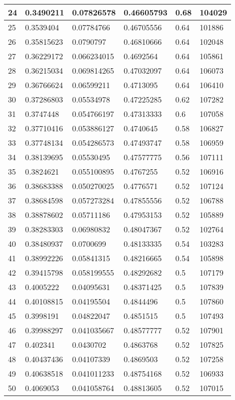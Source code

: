 \begin{longtable}{|l|l|l|l|l|l|}
24 & 0.3490211 & 0.07826578 & 0.46605793 & 0.68 & 104029 \\ \hline 
25 & 0.3539404 & 0.07784766 & 0.46705556 & 0.64 & 101886 \\ \hline 
26 & 0.35815623 & 0.0790797 & 0.46810666 & 0.64 & 102048 \\ \hline 
27 & 0.36229172 & 0.066234015 & 0.4692564 & 0.64 & 105861 \\ \hline 
28 & 0.36215034 & 0.069814265 & 0.47032097 & 0.64 & 106073 \\ \hline 
29 & 0.36766624 & 0.06599211 & 0.4713095 & 0.64 & 106410 \\ \hline 
30 & 0.37286803 & 0.05534978 & 0.47225285 & 0.62 & 107282 \\ \hline 
31 & 0.3747448 & 0.054766197 & 0.47313333 & 0.6 & 107058 \\ \hline 
32 & 0.37710416 & 0.053886127 & 0.4740645 & 0.58 & 106827 \\ \hline 
33 & 0.37748134 & 0.054286573 & 0.47493747 & 0.58 & 106959 \\ \hline 
34 & 0.38139695 & 0.05530495 & 0.47577775 & 0.56 & 107111 \\ \hline 
35 & 0.3824621 & 0.055100895 & 0.4767255 & 0.52 & 106916 \\ \hline 
36 & 0.38683388 & 0.050270025 & 0.4776571 & 0.52 & 107124 \\ \hline 
37 & 0.38684598 & 0.057273284 & 0.47855556 & 0.52 & 106788 \\ \hline 
38 & 0.38878602 & 0.05711186 & 0.47953153 & 0.52 & 105889 \\ \hline 
39 & 0.38283303 & 0.06980832 & 0.48047367 & 0.52 & 102764 \\ \hline 
40 & 0.38480937 & 0.0700699 & 0.48133335 & 0.54 & 103283 \\ \hline 
41 & 0.38992226 & 0.05841315 & 0.48216665 & 0.54 & 105898 \\ \hline 
42 & 0.39415798 & 0.058199555 & 0.48292682 & 0.5 & 107179 \\ \hline 
43 & 0.4005222 & 0.04095631 & 0.48371425 & 0.5 & 107839 \\ \hline 
44 & 0.40108815 & 0.04195504 & 0.4844496 & 0.5 & 107860 \\ \hline 
45 & 0.3998191 & 0.04822047 & 0.4851515 & 0.5 & 107493 \\ \hline 
46 & 0.39988297 & 0.041035667 & 0.48577777 & 0.52 & 107901 \\ \hline 
47 & 0.402341 & 0.0430702 & 0.4863768 & 0.52 & 107825 \\ \hline 
48 & 0.40437436 & 0.04107339 & 0.4869503 & 0.52 & 107258 \\ \hline 
49 & 0.40638518 & 0.041011233 & 0.48754168 & 0.52 & 106933 \\ \hline 
50 & 0.4069053 & 0.041058764 & 0.48813605 & 0.52 & 107015 \\ \hline 
\end{longtable}